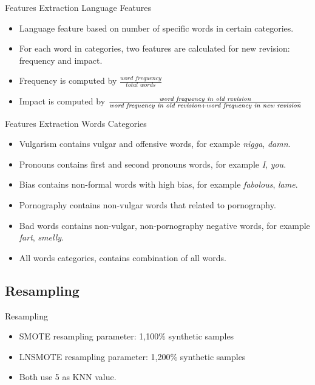 \documentclass[english]{beamer}
\begin{document}
\begin{frame}
	{Features Extraction}
	{Language Features}
	\begin{itemize}
		\item Language feature based on number of specific words in certain
		categories.
		\item For each word in categories, two features are calculated for new
		revision:
		frequency and impact.
		\item Frequency is computed by
			$\frac{\textit{word frequency}}
				{\textit{total words}}$
		\item Impact is computed by $\frac{%
				\textit{word frequency in old revision}
			}{
			\textit{word frequency in old revision}
				+ \textit{word frequency in new revision}
			} $
	\end{itemize}
\end{frame}

\begin{frame}
	{Features Extraction}
	{Words Categories}
	\begin{itemize}
		\item Vulgarism contains vulgar and offensive words, for example
		\textit{nigga}, \textit{damn}.
		\item Pronouns contains first and second pronouns words, for example
		\textit{I}, \textit{you}.
		\item Bias contains non-formal words with high bias, for example
		\textit{fabolous}, \textit{lame}.
		\item Pornography contains non-vulgar words that related to
		pornography.
		\item Bad words contains non-vulgar, non-pornography negative words,
		for example \textit{fart}, \textit{smelly}.
		\item All words categories, contains combination of all words.
	\end{itemize}
\end{frame}

\subsection{Resampling}

\begin{frame}
	{Resampling}
	\begin{itemize}
		\item SMOTE resampling parameter: 1,100\% synthetic samples
		\item LNSMOTE resampling parameter: 1,200\% synthetic samples
		\item Both use 5 as KNN value.
	\end{itemize}
	
\end{frame}
\end{document}

